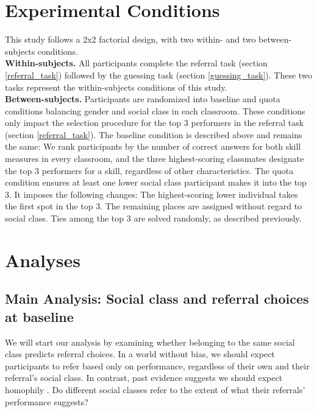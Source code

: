 \documentclass[11pt,a4paper,oneside]{article}
\begin{document}
\section{Experimental Conditions}
This study follows a 2x2 factorial design, with two within- and two between-subjects conditions. \medskip\\
\textbf{Within-subjects.} All participants complete the referral task (section \ref{referral_task}) followed by the guessing task (section \ref{guessing_task}). These two tasks represent the within-subjects conditions of this study. \medskip\\
\textbf{Between-subjects.} Participants are randomized into baseline and quota conditions balancing gender and social class in each classroom. These conditions only impact the selection procedure for the top 3 performers in the referral task (section \ref{referral_task}). The baseline condition is described above and remains the same: We rank participants by the number of correct answers for both skill measures in every classroom, and the three highest-scoring classmates designate the top 3 performers for a skill, regardless of other characteristics. The quota condition ensures at least one lower social class participant makes it into the top 3. It imposes the following changes: The highest-scoring lower individual takes the first spot in the top 3. The remaining places are assigned without regard to social class. Ties among the top 3 are solved randomly, as described previously.



\section{Analyses}

\subsection{Main Analysis: Social class and referral choices at baseline}
We will start our analysis by examining whether belonging to the same social class predicts referral choices. In a world without bias, we should expect participants to refer based only on performance, regardless of their own and their referral's social class. In contrast, past evidence suggests we should expect homophily \citep{beaman_job_2018,bolte_role_2021, montgomery_social_1991}. Do different social classes refer to the extent of what their referrals' performance suggests?\\
\end{document}
